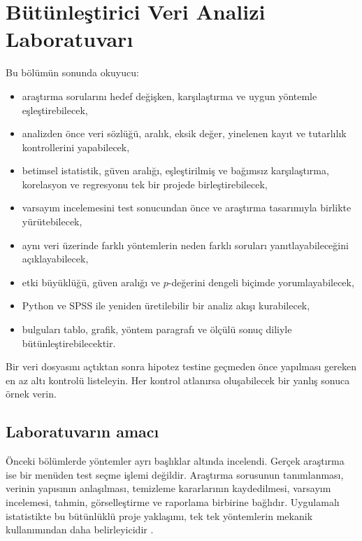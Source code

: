 \chapter{Bütünleştirici Veri Analizi Laboratuvarı}

\begin{hedefler}
Bu bölümün sonunda okuyucu:
\begin{itemize}
  \item araştırma sorularını hedef değişken, karşılaştırma ve uygun yöntemle eşleştirebilecek,
  \item analizden önce veri sözlüğü, aralık, eksik değer, yinelenen kayıt ve tutarlılık kontrollerini yapabilecek,
  \item betimsel istatistik, güven aralığı, eşleştirilmiş ve bağımsız karşılaştırma, korelasyon ve regresyonu tek bir projede birleştirebilecek,
  \item varsayım incelemesini test sonucundan önce ve araştırma tasarımıyla birlikte yürütebilecek,
  \item aynı veri üzerinde farklı yöntemlerin neden farklı soruları yanıtlayabileceğini açıklayabilecek,
  \item etki büyüklüğü, güven aralığı ve $p$-değerini dengeli biçimde yorumlayabilecek,
  \item Python ve SPSS ile yeniden üretilebilir bir analiz akışı kurabilecek,
  \item bulguları tablo, grafik, yöntem paragrafı ve ölçülü sonuç diliyle bütünleştirebilecektir.
\end{itemize}
\end{hedefler}

\begin{hazirlik}
Bir veri dosyasını açtıktan sonra hipotez testine geçmeden önce yapılması
gereken en az altı kontrolü listeleyin. Her kontrol atlanırsa oluşabilecek bir
yanlış sonuca örnek verin.
\end{hazirlik}

\section{Laboratuvarın amacı}

Önceki bölümlerde yöntemler ayrı başlıklar altında incelendi. Gerçek araştırma
ise bir menüden test seçme işlemi değildir. Araştırma sorusunun tanımlanması,
verinin yapısının anlaşılması, temizleme kararlarının kaydedilmesi, varsayım
incelemesi, tahmin, görselleştirme ve raporlama birbirine bağlıdır.
Uygulamalı istatistikte bu bütünlüklü proje yaklaşımı, tek tek yöntemlerin
mekanik kullanımından daha belirleyicidir \cite{mccullagh2022,james2021}.

